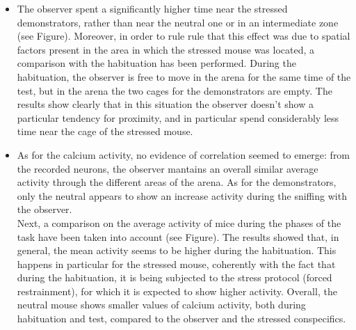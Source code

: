 \documentclass[a4paper]{article}
\begin{document}
\begin{itemize}
	\item The observer spent a significantly higher time near the stressed demonstrators, rather than near the neutral one or in an intermediate zone (see Figure). Moreover, in order to rule rule that this effect was due to spatial factors present in the area in which the stressed mouse was located, a comparison with the habituation has been performed. During the habituation, the observer is free to move in the arena for the same time of the test, but in the arena the two cages for the demonstrators are empty. The results show clearly that in this situation the observer doesn't show a particular tendency for proximity, and in particular spend considerably less time near the cage of the stressed mouse.
	
	\item As for the calcium activity, no evidence of correlation seemed to emerge: from the recorded neurons, the observer mantains an overall similar average activity through the different areas of the arena. As for the demonstrators, only the neutral appears to show an increase activity during the sniffing with the observer.
	\\
	
	Next, a comparison on the average activity of mice during the phases of the task have been taken into account (see Figure). The results showed that, in general, the mean activity seems to be higher during the habituation. This happens in particular for the stressed mouse, coherently with the fact that during the habituation, it is being subjected to the stress protocol (forced restrainment), for which it is expected to show higher activity. Overall, the neutral mouse shows smaller values of calcium activity, both during habituation and test, compared to the observer and the stressed conspecifics.
	
\end{itemize}
\end{document}
